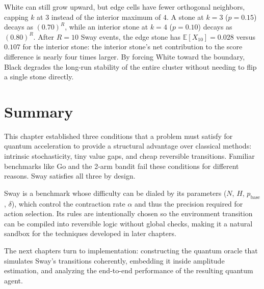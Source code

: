 White can still grow upward, but edge cells have fewer orthogonal neighbors, capping $k$ at $3$ instead of the interior maximum of $4$.
A stone at $k = 3$ ($p = 0.15$) decays as $(0.70)^R$, while an interior stone at $k = 4$ ($p = 0.10$) decays as $(0.80)^R$.
After $R = 10$ Sway events, the edge stone has $\mathbb{E}[X_{10}] = 0.028$ versus $0.107$ for the interior stone: the interior stone's net contribution to the score difference is nearly four times larger.
By forcing White toward the boundary, Black degrades the long-run stability of the entire cluster without needing to flip a single stone directly.

\section{Summary}

This chapter established three conditions that a problem must satisfy for quantum acceleration to provide a structural advantage over classical methods: intrinsic stochasticity, tiny value gaps, and cheap reversible transitions.
Familiar benchmarks like Go and the 2-arm bandit fail these conditions for different reasons.
Sway satisfies all three by design.

Sway is a benchmark whose difficulty can be dialed by its parameters ($N$, $H$, $p_{\text{base}}$, $\delta$), which control the contraction rate $\alpha$ and thus the precision required for action selection.
Its rules are intentionally chosen so the environment transition can be compiled into reversible logic without global checks, making it a natural sandbox for the techniques developed in later chapters.

The next chapters turn to implementation: constructing the quantum oracle that simulates Sway's transitions coherently, embedding it inside amplitude estimation, and analyzing the end-to-end performance of the resulting quantum agent.


